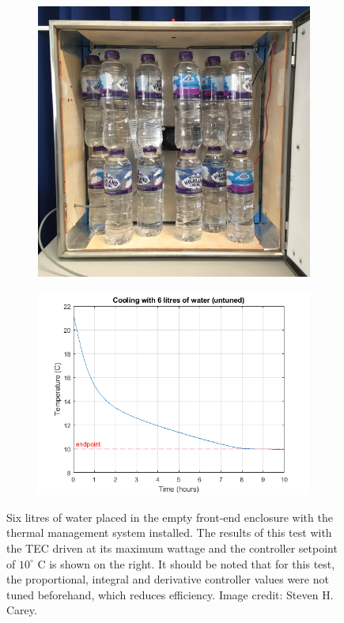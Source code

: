 \begin{figure}
    \centering
    \centering
    \begin{subfigure}{.4\textwidth}
        \centering
        \includegraphics[width=\linewidth]{water}
    \end{subfigure}
    \hfill
    \begin{subfigure}{.55\textwidth}
    \centering
        \includegraphics[width=\linewidth]{water_results}
    \end{subfigure}
    \caption{Six litres of water placed in the empty front-end enclosure with the thermal management system installed. The results of this test with the TEC driven at its maximum wattage and the controller setpoint of $10^\circ$ C is shown on the right. It should be noted that for this test, the proportional, integral and derivative controller values were not tuned beforehand, which reduces efficiency. Image credit: Steven H. Carey.}
    \label{fig:water_test}
\end{figure}


